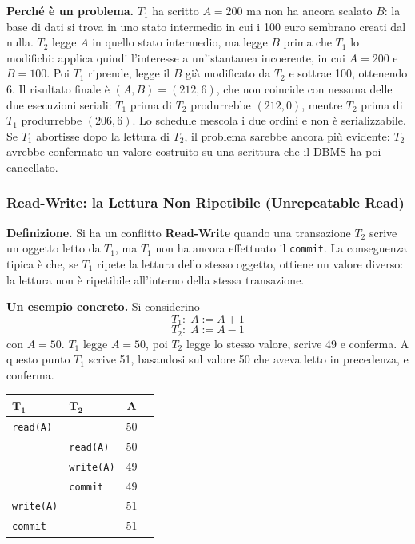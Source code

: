 \documentclass[12pt]{extarticle}
\begin{document}
\noindent \textbf{Perché è un problema.} $T_1$ ha scritto $A=200$ ma non ha ancora scalato $B$: la base di dati si trova in uno stato intermedio in cui i 100 euro sembrano creati dal nulla. $T_2$ legge $A$ in quello stato intermedio, ma legge $B$ prima che $T_1$ lo modifichi: applica quindi l'interesse a un'istantanea incoerente, in cui $A=200$ e $B=100$. Poi $T_1$ riprende, legge il $B$ già modificato da $T_2$ e sottrae 100, ottenendo 6. Il risultato finale è $(A,B)=(212,6)$, che non coincide con nessuna delle due esecuzioni seriali: $T_1$ prima di $T_2$ produrrebbe $(212,0)$, mentre $T_2$ prima di $T_1$ produrrebbe $(206,6)$. Lo schedule mescola i due ordini e non è serializzabile. Se $T_1$ abortisse dopo la lettura di $T_2$, il problema sarebbe ancora più evidente: $T_2$ avrebbe confermato un valore costruito su una scrittura che il DBMS ha poi cancellato.

\subsubsection{Read-Write: la Lettura Non Ripetibile (Unrepeatable Read)}

\noindent \textbf{Definizione.} Si ha un conflitto \textbf{Read-Write} quando una transazione $T_2$ scrive un oggetto letto da $T_1$, ma $T_1$ non ha ancora effettuato il \texttt{commit}. La conseguenza tipica è che, se $T_1$ ripete la lettura dello stesso oggetto, ottiene un valore diverso: la lettura non è ripetibile all'interno della stessa transazione.

\medskip
\noindent \textbf{Un esempio concreto.} Si considerino
\[
T_1:\; A:=A+1
\]
\[
T_2:\; A:=A-1
\]
con $A=50$. $T_1$ legge $A=50$, poi $T_2$ legge lo stesso valore, scrive 49 e conferma. A questo punto $T_1$ scrive 51, basandosi sul valore 50 che aveva letto in precedenza, e conferma.

\begin{center}
\small
\begin{tabular}{@{}llcc@{}}
    \toprule
    $\boldsymbol{T_1}$ & $\boldsymbol{T_2}$ & $\boldsymbol{A}$ \\
    \midrule
    \texttt{read(A)}       &      & 50 \\
     & \texttt{read(A)}       & 50 \\
     & \texttt{write(A)}      & 49 \\
     & \texttt{commit}        & 49 \\
    \texttt{write(A)}      &      & 51 \\
    \texttt{commit}        &      & 51 \\
    \bottomrule
\end{tabular}
\end{center}
\end{document}

